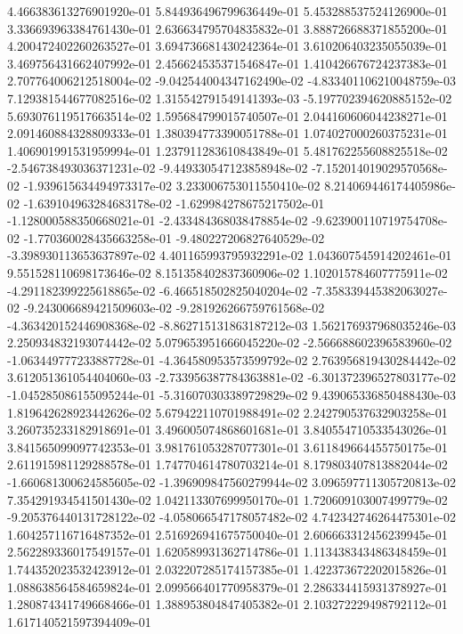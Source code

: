 4.466383613276901920e-01
5.844936496799636449e-01
5.453288537524126900e-01
3.336693963384761430e-01
2.636634795704835832e-01
3.888726688371855200e-01
4.200472402260263527e-01
3.694736681430242364e-01
3.610206403235055039e-01
3.469756431662407992e-01
2.456624535371546847e-01
1.410426676724237383e-01
2.707764006212518004e-02
-9.042544004347162490e-02
-4.833401106210048759e-03
7.129381544677082516e-02
1.315542791549141393e-03
-5.197702394620885152e-02
5.693076119517663514e-02
1.595684799015740507e-01
2.044160606044238271e-01
2.091460884328809333e-01
1.380394773390051788e-01
1.074027000260375231e-01
1.406901991531959994e-01
1.237911283610843849e-01
5.481762255608825518e-02
-2.546738493036371231e-02
-9.449330547123858948e-02
-7.152014019029570568e-02
-1.939615634494973317e-02
3.233006753011550410e-02
8.214069446174405986e-02
-1.639104963284683178e-02
-1.629984278675217502e-01
-1.128000588350668021e-01
-2.433484368038478854e-02
-9.623900110719754708e-02
-1.770360028435663258e-01
-9.480227206827640529e-02
-3.398930113653637897e-02
4.401165993795932291e-02
1.043607545914202461e-01
9.551528110698173646e-02
8.151358402837360906e-02
1.102015784607775911e-02
-4.291182399225618865e-02
-6.466518502825040204e-02
-7.358339445382063027e-02
-9.243006689421509603e-02
-9.281926266759761568e-02
-4.363420152446908368e-02
-8.862715131863187212e-03
1.562176937968035246e-03
2.250934832193074442e-02
5.079653951666045220e-02
-2.566688602396583960e-02
-1.063449777233887728e-01
-4.364580953573599792e-02
2.763956819430284442e-02
3.612051361054404060e-03
-2.733956387784363881e-02
-6.301372396527803177e-02
-1.045285086155095244e-01
-5.316070303389729829e-02
9.439065336850488430e-03
1.819642628923442626e-02
5.679422110701988491e-02
2.242790537632903258e-01
3.260735233182918691e-01
3.496005074868601681e-01
3.840554710533543026e-01
3.841565099097742353e-01
3.981761053287077301e-01
3.611849664455750175e-01
2.611915981129288578e-01
1.747704614780703214e-01
8.179803407813882044e-02
-1.660681300624585605e-02
-1.396909847560279944e-02
3.096597711305720813e-02
7.354291934541501430e-02
1.042113307699950170e-01
1.720609103007499779e-02
-9.205376440131728122e-02
-4.058066547178057482e-02
4.742342746264475301e-02
1.604257116716487352e-01
2.516926941675750040e-01
2.606663312456239945e-01
2.562289336017549157e-01
1.620589931362714786e-01
1.113438343486348459e-01
1.744352023532423912e-01
2.032207285174157385e-01
1.422373672202015826e-01
1.088638564584659824e-01
2.099566401770958379e-01
2.286334415931378927e-01
1.280874341749668466e-01
1.388953804847405382e-01
2.103272229498792112e-01
1.617140521597394409e-01

